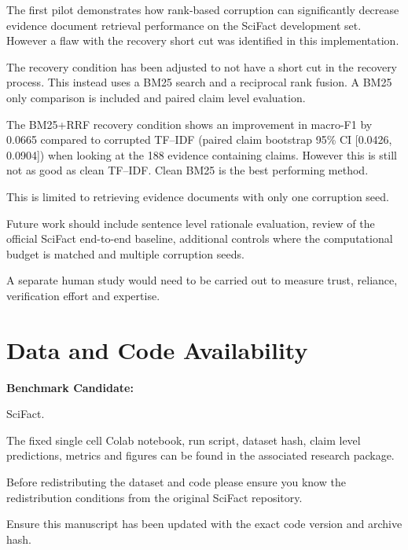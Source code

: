 \documentclass[11pt,a4paper]{article}
\begin{document}
The first pilot demonstrates how rank-based corruption can significantly decrease evidence document retrieval performance on the SciFact development set. However a flaw with the recovery short cut was identified in this implementation.

The recovery condition has been adjusted to not have a short cut in the recovery process. This instead uses a BM25 search and a reciprocal rank fusion. A BM25 only comparison is included and paired claim level evaluation.

The BM25+RRF recovery condition shows an improvement in macro-F1 by 0.0665 compared to corrupted TF--IDF (paired claim bootstrap 95\% CI [0.0426, 0.0904]) when looking at the 188 evidence containing claims. However this is still not as good as clean TF--IDF. Clean BM25 is the best performing method.

This is limited to retrieving evidence documents with only one corruption seed.

Future work should include sentence level rationale evaluation, review of the official SciFact end-to-end baseline, additional controls where the computational budget is matched and multiple corruption seeds.

A separate human study would need to be carried out to measure trust, reliance, verification effort and expertise.

\section*{Data and Code Availability}

\textbf{Benchmark Candidate:}

SciFact.

The fixed single cell Colab notebook, run script, dataset hash, claim level predictions, metrics and figures can be found in the associated research package.

Before redistributing the dataset and code please ensure you know the redistribution conditions from the original SciFact repository.

Ensure this manuscript has been updated with the exact code version and archive hash.
\end{document}
